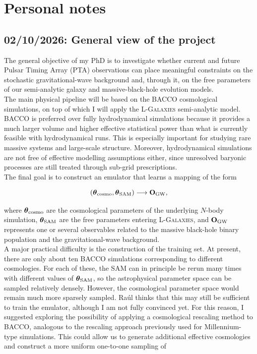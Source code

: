 \documentclass[10.9pt,a4paper,twoside]{article}
\begin{document}
\fontsize{11pt}{13.2pt}\selectfont

\section*{Personal notes}

\subsection*{02/10/2026: General view of the project}

The general objective of my PhD is to investigate whether current and future Pulsar Timing Array (PTA) observations can place meaningful constraints on the stochastic gravitational-wave background and, through it, on the free parameters of our semi-analytic galaxy and massive-black-hole evolution models. \\

The main physical pipeline will be based on the BACCO cosmological simulations, on top of which I will apply the \textsc{L-Galaxies} semi-analytic model. BACCO is preferred over fully hydrodynamical simulations because it provides a much larger volume and higher effective statistical power than what is currently feasible with hydrodynamical runs. This is especially important for studying rare massive systems and large-scale structure. Moreover, hydrodynamical simulations are not free of effective modelling assumptions either, since unresolved baryonic processes are still treated through sub-grid prescriptions. \\

The final goal is to construct an emulator that learns a mapping of the form

\[
\left(
\boldsymbol{\theta}_{\rm cosmo},
\boldsymbol{\theta}_{\rm SAM}
\right)
\longrightarrow
\mathbf{O}_{\rm GW},
\]

where $\boldsymbol{\theta}_{\rm cosmo}$ are the cosmological parameters of the underlying $N$-body simulation, $\boldsymbol{\theta}_{\rm SAM}$ are the free parameters entering \textsc{L-Galaxies}, and $\mathbf{O}_{\rm GW}$ represents one or several observables related to the massive black-hole binary population and the gravitational-wave background. \\

A major practical difficulty is the construction of the training set. At present, there are only about ten BACCO simulations corresponding to different cosmologies. For each of these, the SAM can in principle be rerun many times with different values of $\boldsymbol{\theta}_{\rm SAM}$, so the astrophysical parameter space can be sampled relatively densely. However, the cosmological parameter space would remain much more sparsely sampled. Raúl thinks that this may still be sufficient to train the emulator, although I am not fully convinced yet. For this reason, I suggested exploring the possibility of applying a cosmological rescaling method to BACCO, analogous to the rescaling approach previously used for Millennium-type simulations. This could allow us to generate additional effective cosmologies and construct a more uniform one-to-one sampling of
\end{document}
